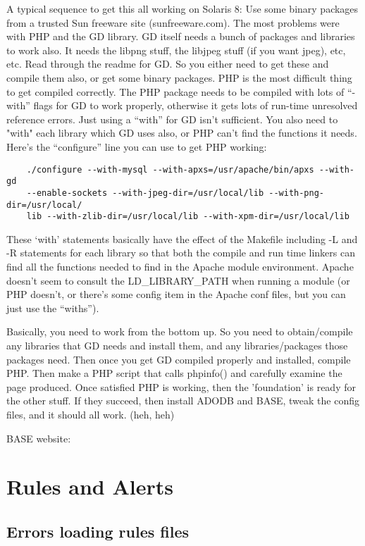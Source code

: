 \documentclass{article}
\begin{document}
A typical sequence to get this all working on Solaris 8: Use some binary
packages from a trusted Sun freeware site (sunfreeware.com). The most problems
were with PHP and the GD library. GD itself needs a bunch of packages and
libraries to work also. It needs the libpng stuff, the libjpeg stuff (if you
want jpeg), etc, etc. Read through the readme for GD. So you either need to get
these and compile them also, or get some binary packages. PHP is the most
difficult thing to get compiled correctly. The PHP package needs to be compiled
with lots of ``-with'' flags for GD to work properly, otherwise it gets lots of
run-time unresolved reference errors. Just using a ``with'' for GD isn't
sufficient. You also need to "with" each library which GD uses also, or PHP
can't find the functions it needs. Here's the ``configure'' line you can use to
get PHP working:
\begin{verbatim}
    ./configure --with-mysql --with-apxs=/usr/apache/bin/apxs --with-gd
    --enable-sockets --with-jpeg-dir=/usr/local/lib --with-png-dir=/usr/local/
    lib --with-zlib-dir=/usr/local/lib --with-xpm-dir=/usr/local/lib
\end{verbatim}
 These `with' statements basically have the effect of the Makefile including -L
and -R statements for each library so that both the compile and run time
linkers can find all the functions needed to find in the Apache module
environment. Apache doesn't seem to consult the LD\_LIBRARY\_PATH when running a
module (or PHP doesn't, or there's some config item in the Apache conf files,
but you can just use the ``withs'').

Basically, you need to work from the bottom up. So you need to obtain/compile
any libraries that GD needs and install them, and any libraries/packages those
packages need. Then once you get GD compiled properly and installed, compile
PHP. Then make a PHP script that calls phpinfo() and carefully examine the page
produced. Once satisfied PHP is working, then the 'foundation' is ready for the
other stuff. If they succeed, then install ADODB and BASE, tweak the config
files, and it should all work. (heh, heh)

BASE website: 

\section{Rules and Alerts}

\subsection{Errors loading rules files}
\end{document}
